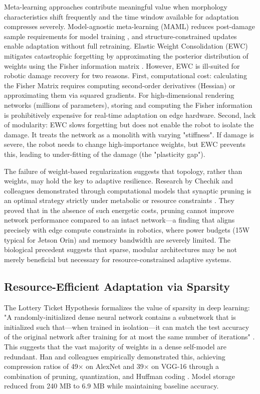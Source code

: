 \documentclass[12pt,a4paper,oneside]{report}
\begin{document}
Meta-learning approaches contribute meaningful value when morphology characteristics shift frequently and the time window available for adaptation compresses severely. Model-agnostic meta-learning (MAML) reduces post-damage sample requirements for model training \cite{finn2017maml}, and structure-constrained updates enable adaptation without full retraining. Elastic Weight Consolidation (EWC) mitigates catastrophic forgetting by approximating the posterior distribution of weights using the Fisher information matrix \cite{kirkpatrick2017overcoming}. However, EWC is ill-suited for robotic damage recovery for two reasons. First, computational cost: calculating the Fisher Matrix requires computing second-order derivatives (Hessian) or approximating them via squared gradients. For high-dimensional rendering networks (millions of parameters), storing and computing the Fisher information is prohibitively expensive for real-time adaptation on edge hardware. Second, lack of modularity: EWC slows forgetting but does not enable the robot to isolate the damage. It treats the network as a monolith with varying "stiffness". If damage is severe, the robot needs to change high-importance weights, but EWC prevents this, leading to under-fitting of the damage (the "plasticity gap").

The failure of weight-based regularization suggests that topology, rather than weights, may hold the key to adaptive resilience. Research by Chechik and colleagues demonstrated through computational models that synaptic pruning is an optimal strategy strictly under metabolic or resource constraints \cite{chechik1998synaptic}. They proved that in the absence of such energetic costs, pruning cannot improve network performance compared to an intact network—a finding that aligns precisely with edge compute constraints in robotics, where power budgets (15W typical for Jetson Orin) and memory bandwidth are severely limited. The biological precedent suggests that sparse, modular architectures may be not merely beneficial but necessary for resource-constrained adaptive systems.

\subsection{Resource-Efficient Adaptation via Sparsity}

The Lottery Ticket Hypothesis formalizes the value of sparsity in deep learning: "A randomly-initialized dense neural network contains a subnetwork that is initialized such that—when trained in isolation—it can match the test accuracy of the original network after training for at most the same number of iterations" \cite{frankle2018lottery}. This suggests that the vast majority of weights in a dense self-model are redundant. Han and colleagues empirically demonstrated this, achieving compression ratios of 49× on AlexNet and 39× on VGG-16 through a combination of pruning, quantization, and Huffman coding \cite{han2015deep}. Model storage reduced from 240 MB to 6.9 MB while maintaining baseline accuracy.
\end{document}
